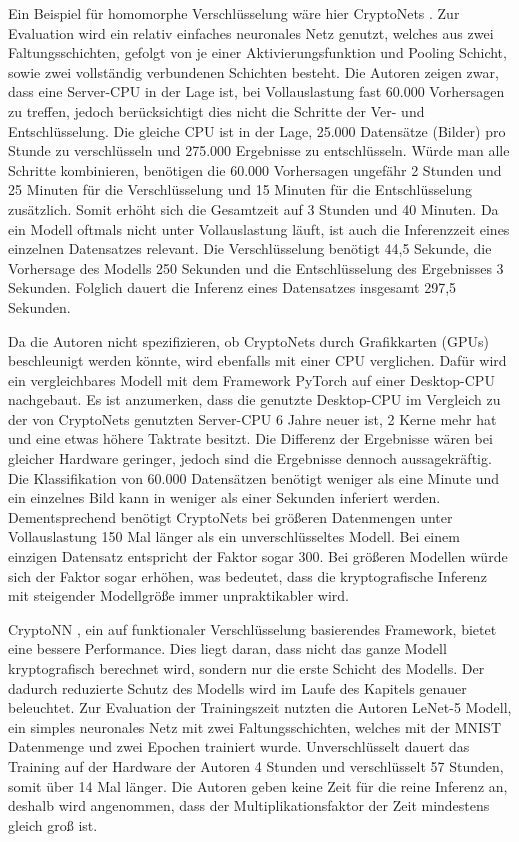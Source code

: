 Ein Beispiel für homomorphe Verschlüsselung wäre hier CryptoNets \cite{P-54}.
Zur Evaluation wird ein relativ einfaches neuronales Netz genutzt, welches aus zwei Faltungsschichten, gefolgt von je einer Aktivierungsfunktion und Pooling Schicht, sowie zwei vollständig verbundenen Schichten besteht.
Die Autoren zeigen zwar, dass eine Server-CPU in der Lage ist, bei Vollauslastung fast 60.000 Vorhersagen zu treffen, jedoch berücksichtigt dies nicht die Schritte der Ver- und Entschlüsselung.
Die gleiche CPU ist in der Lage, 25.000 Datensätze (Bilder) pro Stunde zu verschlüsseln und 275.000 Ergebnisse zu entschlüsseln.
Würde man alle Schritte kombinieren, benötigen die 60.000 Vorhersagen ungefähr 2 Stunden und 25 Minuten für die Verschlüsselung und 15 Minuten für die Entschlüsselung zusätzlich.
Somit erhöht sich die Gesamtzeit auf 3 Stunden und 40 Minuten.
Da ein Modell oftmals nicht unter Vollauslastung läuft, ist auch die Inferenzzeit eines einzelnen Datensatzes relevant.
Die Verschlüsselung benötigt 44,5 Sekunde, die Vorhersage des Modells 250 Sekunden und die Entschlüsselung des Ergebnisses 3 Sekunden. 
Folglich dauert die Inferenz eines Datensatzes insgesamt 297,5 Sekunden.

Da die Autoren nicht spezifizieren, ob CryptoNets durch Grafikkarten (GPUs) beschleunigt werden könnte, wird ebenfalls mit einer CPU verglichen.
Dafür wird ein vergleichbares Modell mit dem Framework PyTorch auf einer Desktop-CPU nachgebaut.
Es ist anzumerken, dass die genutzte Desktop-CPU im Vergleich zu der von CryptoNets genutzten Server-CPU 6 Jahre neuer ist, 2 Kerne mehr hat und eine etwas höhere Taktrate besitzt.
Die Differenz der Ergebnisse wären bei gleicher Hardware geringer, jedoch sind die Ergebnisse dennoch aussagekräftig.
Die Klassifikation von 60.000 Datensätzen benötigt weniger als eine Minute und ein einzelnes Bild kann in weniger als einer Sekunden inferiert werden.
Dementsprechend benötigt CryptoNets bei größeren Datenmengen unter Vollauslastung 150 Mal länger als ein unverschlüsseltes Modell. 
Bei einem einzigen Datensatz entspricht der Faktor sogar 300.
Bei größeren Modellen würde sich der Faktor sogar erhöhen, was bedeutet, dass die kryptografische Inferenz mit steigender Modellgröße immer unpraktikabler wird.


CryptoNN \cite{P-53}, ein auf funktionaler Verschlüsselung basierendes Framework, bietet eine bessere Performance.
Dies liegt daran, dass nicht das ganze Modell kryptografisch berechnet wird, sondern nur die erste Schicht des Modells.
Der dadurch reduzierte Schutz des Modells wird im Laufe des Kapitels genauer beleuchtet.
Zur Evaluation der Trainingszeit nutzten die Autoren LeNet-5 Modell, ein simples neuronales Netz mit zwei Faltungsschichten, welches mit der MNIST Datenmenge \cite{D-MNIST} und zwei Epochen trainiert wurde.
Unverschlüsselt dauert das Training auf der Hardware der Autoren 4 Stunden und verschlüsselt 57 Stunden, somit über 14 Mal länger.
Die Autoren geben keine Zeit für die reine Inferenz an, deshalb wird angenommen, dass der Multiplikationsfaktor der Zeit mindestens gleich groß ist.

